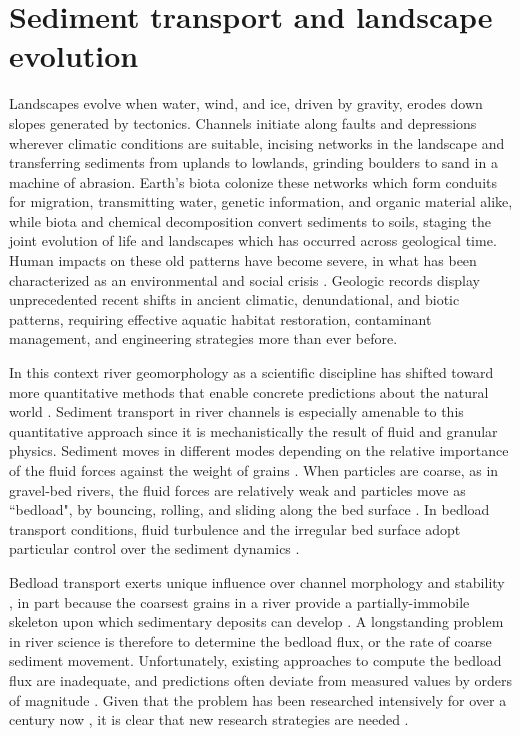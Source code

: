 
\chapter{Sediment transport and landscape evolution}
\label{ch:Introduction}

Landscapes evolve when water, wind, and ice, driven by gravity, erodes down slopes generated by tectonics.
Channels initiate along faults and depressions wherever climatic conditions are suitable, incising networks in the landscape and transferring sediments from uplands to lowlands, grinding boulders to sand in a machine of abrasion.
Earth's biota colonize these networks which form conduits for migration, transmitting water, genetic information, and organic material alike, while biota and chemical decomposition convert sediments to soils, staging the joint evolution of life and landscapes which has occurred across geological time.
Human impacts on these old patterns have become severe, in what has been characterized as an environmental and social crisis \citep{Slaymaker2021}.
Geologic records display unprecedented recent shifts in ancient climatic, denundational, and biotic patterns, requiring effective aquatic habitat restoration, contaminant management, and engineering strategies more than ever before.

In this context river geomorphology as a scientific discipline has shifted toward more quantitative methods that enable concrete predictions about the natural world \citep{Church2005,Church2010}.
Sediment transport in river channels is especially amenable to this quantitative approach since it is mechanistically the result of fluid and granular physics.
Sediment moves in different modes depending on the relative importance of the fluid forces against the weight of grains \citep{Bagnold1956}.
When particles are coarse, as in gravel-bed rivers, the fluid forces are relatively weak and particles move as ``bedload", by bouncing, rolling, and sliding along the bed surface \citep{Kalinske1947,Gomez1991}. In bedload transport conditions, fluid turbulence and the irregular bed surface adopt particular control over the sediment dynamics \citep{Frey2009,Frey2011}.

Bedload transport exerts unique influence over channel morphology and stability \citep{Church2006,Recking2016}, in part because the coarsest grains in a river provide a partially-immobile skeleton upon which sedimentary deposits can develop \citep{Hassan2008, Eaton2020}.
A longstanding problem in river science is therefore to determine the bedload flux, or the rate of coarse sediment movement.
Unfortunately, existing approaches to compute the bedload flux are inadequate, and predictions often deviate from measured values by orders of magnitude \citep{Gomez1989, Barry2004, Bathurst2007a, Recking2012}.
Given that the problem has been researched intensively for over a century now \citep{Gilbert1914}, it is clear that new research strategies are needed \citep{Ancey2020a,Ancey2020}.

